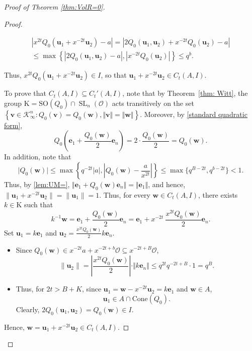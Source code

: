 \documentclass[11pt,a4paper,reqno]{amsart}
\newcommand{\SO}{{\mathrm{SO}}}
\newcommand{\Cone}{\mathrm{Cone}}
\theoremstyle{definition}
\theoremstyle{remark}
\numberwithin{equation}{section}
\begin{document}
\begin{proof}[Proof of Theorem \ref{thm:VolR=0}]
\begin{proof}
\begin{itemize}
\begin{equation}
\begin{split}
\left| x^{2t}Q_0(\mathbf u_1 + x^{-2t}\mathbf u_2)-a\right|
=\left| 2Q_0(\mathbf u_1, \mathbf u_2)+x^{-2t}Q_0(\mathbf u_2)-a\right|\\
\leq \max\left\{\left| 2Q_0(\mathbf{u}_1,\mathbf{u}_2)-a\right|,\left|x^{-2t}Q_0(\mathbf{u}_2)\right|\right\}\leq q^b.
\end{split}
\end{equation}
\end{itemize}
Thus, $x^{2t}Q_0(\mathbf{u}_1+x^{-2t}\mathbf{u}_2)\in I$, so that $\mathbf{u}_1+x^{-2t}\mathbf{u}_2\in C_t(A,I)$. 
\vspace{5pt}

\noindent To prove that $C_t(A,I)\subseteq C_t'(A,I)$, note that by Theorem~\ref{thm: Witt}, the group $\mathrm{K}=\SO(Q_0)\cap \operatorname{SL}_n(\mathcal{O})$ acts transitively on the set $\left\{\mathbf{v}\in \mathcal{K}_{\infty}^n:Q_0(\mathbf{v})=Q_0(\mathbf{w}),\Vert \mathbf{v}\Vert=\Vert \mathbf{w}\Vert\right\}$. Moreover, by \eqref{standard quadratic form},
$$Q_0\left(\mathbf{e}_1+\frac{Q_0(\mathbf{w})}{2}\mathbf{e}_n\right)=2\cdot \frac{Q_0(\mathbf{w})}{2}=Q_0(\mathbf{w}).$$
In addition, note that $$\vert Q_0(\mathbf{w})\vert\leq \max\left\{q^{-2t}\vert a\vert,\left|Q_0(\mathbf{w})-\frac{a}{x^{2t}}\right|\right\}\leq \max\{q^{B-2t},q^{b-2t}\}<1.$$ Thus, by \eqref{lem:UM=}, $\Vert\mathbf{e}_1+Q_0(\mathbf{w})\mathbf{e}_n\Vert=\Vert \mathbf{e}_1\Vert$, and hence, $\|\mathbf u_1+x^{-2t}\mathbf u_2\|=\|\mathbf u_1\|=1$.
Thus, for every $\mathbf w\in C_t(A,I)$, there exists $k\in \mathrm{K}$ such that
\[
k^{-1}\mathbf w=\mathbf{e}_1+\frac{Q_0(\mathbf{w})}{2}\mathbf{e}_n=\mathbf e_1+ x^{-2t}\:\frac {x^{2t}Q_0(\mathbf w)} 2\mathbf e_n.
\]
Set $\mathbf u_1=k\mathbf e_1$ and $\mathbf u_2=\frac {x^{2t}Q_0(\mathbf w)} 2 k\mathbf e_n$. 


\begin{itemize} 
\item Since $Q_0(\mathbf w)\in x^{-2t}a+x^{-2t+b}\mathcal O\subseteq x^{-2t+B}\mathcal{O}$,
\[
\|\mathbf u_2\|=\left| \frac {x^{2t}Q_0(\mathbf w)}{2}\right|\cdot \Vert k\mathbf{e}_n\Vert\le q^{2t}q^{-2t+B}\cdot 1=q^B.
\]
\vspace{1pt}
\item Thus, for $2t>B+K$, since $\mathbf u_1=\mathbf w- x^{-2t}\mathbf u_2=k\mathbf{e}_1$ and $\mathbf w\in A$,
\[
\mathbf u_1 \in A \cap \Cone(Q_0).
\]
Clearly, $2Q_0(\mathbf u_1, \mathbf u_2)=Q_0(\mathbf w)\in I$.
\end{itemize}
Hence, $\mathbf{w}=\mathbf{u}_1+x^{-2t}\mathbf{u}_2\in C_t(A,I)$.
\vspace{5pt}


\end{proof}
\end{proof}
\end{document}
